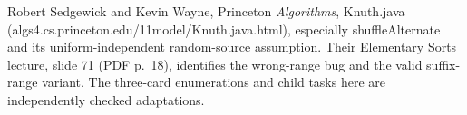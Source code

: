 Robert Sedgewick and Kevin Wayne, Princeton \emph{Algorithms}, Knuth.java (algs4.cs.princeton.edu/11model/Knuth.java.html), especially shuffleAlternate and its uniform-independent random-source assumption. Their Elementary Sorts lecture, slide 71 (PDF p.\ 18), identifies the wrong-range bug and the valid suffix-range variant. The three-card enumerations and child tasks here are independently checked adaptations.
